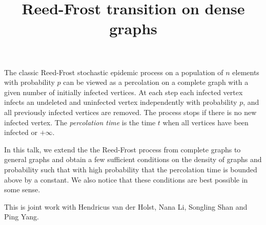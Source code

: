 \title{Reed-Frost transition on dense graphs}
\endtitle

The classic Reed-Frost stochastic epidemic process on a population of $n$ elements with probability $p$  can be viewed as a percolation on a complete graph with a given number of initially infected vertices.  At each step each infected vertex infects an undeleted and uninfected vertex independently with probability $p$, and all previously infected vertices  are removed. The process stops if there is no new infected vertex. The {\it percolation time} is the time $t$ when all vertices have been infected or $+\infty$.  

In this talk, we extend the the Reed-Frost process from complete graphs to general graphs and obtain a few sufficient conditions on the density of graphs and probability such that with high probability that the percolation time is bounded above by a constant. We also notice that these conditions are best possible in some sense. 

This is joint work with { Hendricus van der Holst, Nana Li,  Songling Shan} and {Ping Yang}. 